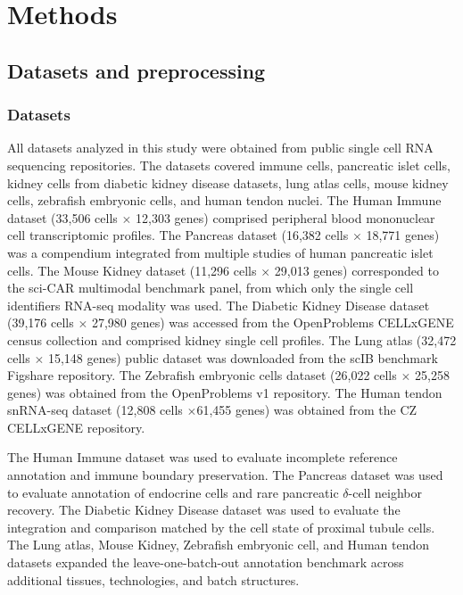 \documentclass[11pt]{article}
\begin{document}
\section*{Methods}

\subsection*{Datasets and preprocessing}

\subsubsection*{Datasets}

All datasets analyzed in this study were obtained from public single cell RNA sequencing repositories. The datasets covered immune cells, pancreatic islet cells, kidney cells from diabetic kidney disease datasets, lung atlas cells, mouse kidney cells, zebrafish embryonic cells, and human tendon nuclei. The Human Immune dataset (33,506 cells $\times$ 12,303 genes) comprised peripheral blood mononuclear cell transcriptomic profiles\cite{Villani2017Immune}. The Pancreas dataset (16,382 cells $\times$ 18,771 genes) was a compendium integrated from multiple studies of human pancreatic islet cells\cite{Baron2016Pancreas,Segerstolpe2016Pancreas,Xin2016Pancreas,Lawlor2017Pancreas}. The Mouse Kidney dataset (11,296 cells $\times$ 29,013 genes) corresponded to the sci-CAR multimodal benchmark panel, from which only the single cell identifiers RNA-seq modality was used. The Diabetic Kidney Disease dataset (39,176 cells $\times$ 27,980 genes) was accessed from the OpenProblems CELLxGENE census collection and comprised kidney single cell profiles\cite{Muto2021Kidney,Wilson2022DKD}. The Lung atlas (32,472 cells $\times$ 15,148 genes) public dataset was downloaded from the scIB benchmark Figshare repository\cite{Luecken2022IntegrationBenchmark}. The Zebrafish embryonic cells dataset (26,022 cells $\times$ 25,258 genes) was obtained from the OpenProblems v1 repository. The Human tendon snRNA-seq dataset (12,808 cells $\times$61,455 genes) was obtained from the CZ CELLxGENE repository.

The Human Immune dataset was used to evaluate incomplete reference annotation and immune boundary preservation. The Pancreas dataset was used to evaluate annotation of endocrine cells and rare pancreatic $\delta$-cell neighbor recovery. The Diabetic Kidney Disease dataset was used to evaluate the integration and comparison matched by the cell state of proximal tubule cells. The Lung atlas, Mouse Kidney, Zebrafish embryonic cell, and Human tendon datasets expanded the leave-one-batch-out annotation benchmark across additional tissues, technologies, and batch structures.
\end{document}
